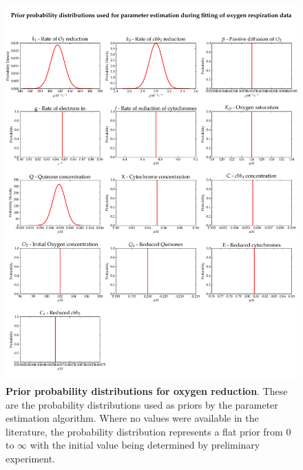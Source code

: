 \begin{figure}[tbp]
 \centering
 \includegraphics[width=15cm]{./05-oxygenreduction/data/priors.pdf}
 \caption[Prior probability distributions for oxygen reduction]{{\bf Prior probability distributions for oxygen reduction}. These are the probability distributions used as priors by the parameter estimation algorithm. Where no values were available in the literature, the probability distribution represents a flat prior from 0 to $\infty$ with the initial value being determined by preliminary experiment.
 \label{fig:oxypriors}}
\end{figure}

